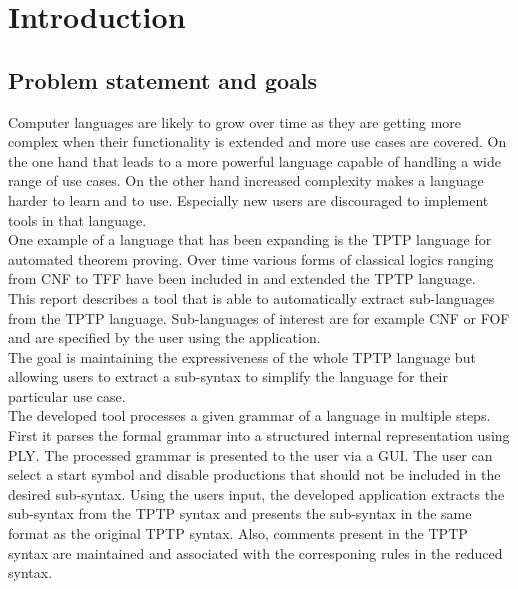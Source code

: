 
\chapter{Introduction}\label{cha:Introduction}

\section{Problem statement and goals}\label{sec:Aufgabenstellung}
Computer languages are likely to grow over time as they are getting more complex when their functionality is extended and more use cases are covered.
On the one hand that leads to a more powerful language capable of handling a wide range of use cases.
On the other hand increased complexity makes a language harder to learn and to use. Especially new users are discouraged to implement tools in that language.\\
One example of a language that has been expanding is the \ac{TPTP} language for automated theorem proving. Over time
various forms of classical logics ranging from \ac{CNF} to \ac{TFF} have been included in and extended the \ac{TPTP} language. \\
This report describes a tool that is able to automatically extract sub-languages from the \ac{TPTP} language. Sub-languages of interest are for example \ac{CNF} or \ac{FOF} and are specified by the user using the application.\\
The goal is maintaining the expressiveness of the whole \ac{TPTP} language but allowing users to extract a sub-syntax to simplify the language for their particular use case. \\
The developed tool processes a given grammar of a language in multiple steps.
First it parses the formal grammar into a structured internal representation using \ac{PLY}.
The processed grammar is presented to the user via a GUI. The user can select a start symbol and disable productions that should not be included in the desired sub-syntax.
Using the users input, the developed application extracts the sub-syntax from the \ac{TPTP} syntax and presents the sub-syntax in the same format as the original \ac{TPTP} syntax.
Also, comments present in the \ac{TPTP} syntax are maintained and associated with the corresponing rules in the reduced syntax.
